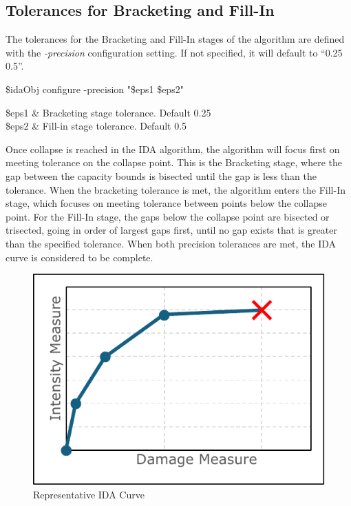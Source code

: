 \documentclass{article}
\renewcommand{\^}[1]{\textsuperscript{#1}}
\renewcommand{\_}[1]{\textsubscript{#1}}
\begin{document}
\subsection{Tolerances for Bracketing and Fill-In}
The tolerances for the Bracketing and Fill-In stages of the algorithm are defined with the \textit{-precision} configuration setting. If not specified, it will default to ``0.25 0.5''.
\begin{syntax}
\$idaObj configure -precision "\$eps1 \$eps2"
\end{syntax}
\begin{args}
\$eps1 & Bracketing stage tolerance. Default 0.25 \\
\$eps2 & Fill-in stage tolerance. Default 0.5
\end{args}
Once collapse is reached in the IDA algorithm, the algorithm will focus first on meeting tolerance on the collapse point. 
This is the Bracketing stage, where the gap between the capacity bounds is bisected until the gap is less than the tolerance.
When the bracketing tolerance is met, the algorithm enters the Fill-In stage, which focuses on meeting tolerance between points below the collapse point.
For the Fill-In stage, the gaps below the collapse point are bisected or trisected, going in order of largest gaps first, until no gap exists that is greater than the specified tolerance.
When both precision tolerances are met, the IDA curve is considered to be complete. 
\\

\begin{figure}[!htb]
\centering
\includegraphics{ida_curve}
\caption{Representative IDA Curve}
\label{fig:ida_curve}
\end{figure}
\end{document}
